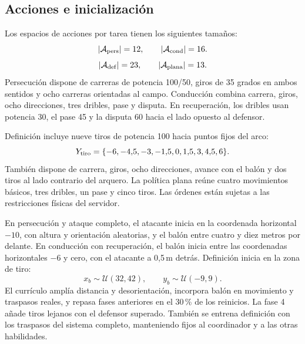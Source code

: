 \subsection{Acciones e inicialización}
Los espacios de acciones por tarea tienen los siguientes tamaños:
\[
    |\mathcal{A}_{\rm pers}|=12,\qquad |\mathcal{A}_{\rm cond}|=16.
\]
\[
    |\mathcal{A}_{\rm def}|=23,\qquad |\mathcal{A}_{\rm plana}|=13.
\]
Persecución dispone de carreras de potencia 100/50, giros de 35 grados en ambos
sentidos y ocho carreras orientadas al campo. Conducción combina carrera, giros,
ocho direcciones, tres dribles, pase y disputa. En recuperación, los dribles usan
potencia 30, el pase 45 y la disputa 60 hacia el lado opuesto al defensor.

Definición incluye nueve tiros de potencia 100 hacia puntos fijos del arco:
\[
    Y_{\rm tiro}=\{-6,-4{,}5,-3,-1{,}5,0,1{,}5,3,4{,}5,6\}.
\]
También dispone de carrera, giros, ocho direcciones, avance con el balón y dos
tiros al lado contrario del arquero.
La política plana reúne cuatro movimientos básicos, tres dribles, un pase y
cinco tiros. Las órdenes están sujetas a las restricciones físicas del servidor.

En persecución y ataque completo, el atacante inicia en la coordenada horizontal
$-10$, con altura y orientación aleatorias, y el balón entre cuatro y diez metros
por delante. En conducción con recuperación, el balón inicia entre las coordenadas
horizontales $-6$ y cero, con el atacante a 0,5\,m detrás. Definición inicia en
la zona de tiro:
\[
    x_b\sim\mathcal{U}(32,42),\qquad y_b\sim\mathcal{U}(-9,9).
\]
El currículo amplía distancia y desorientación, incorpora balón en movimiento y
traspasos reales, y repasa fases anteriores en el 30\,\% de los reinicios. La fase
4 añade tiros lejanos con el defensor superado. También se entrena definición
con los traspasos del sistema completo, manteniendo fijos al coordinador y
a las otras habilidades.

